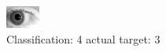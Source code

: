 \begin{figure}[h!]
\begin{center}
\includegraphics[width=0.60\columnwidth]{figures/ID281_class_4_target_3.png}
\end{center}
\caption{ Classification: 4 actual target: 3}
\label{fig:ID281_class_4_target_3}
\end{figure}
